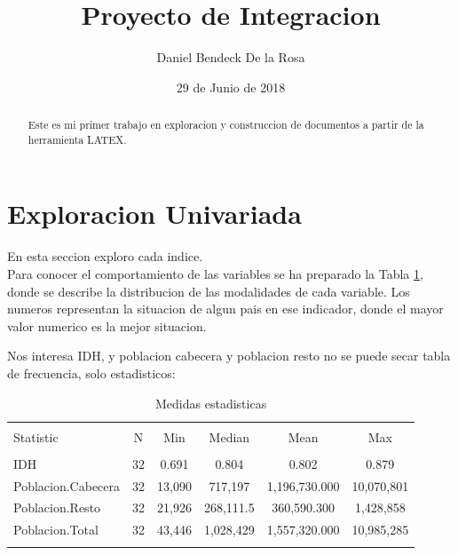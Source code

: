 \documentclass{article}
\title{Proyecto de Integracion}
\author{\normalsize Daniel Bendeck De la Rosa}
\affil{\small Escuela de Ingenieria,Universidad de los Andes\\Bogota, Colombia}
\date{29 de Junio de 2018}
\begin{document}


\maketitle


%


\begin{abstract}
Este es mi primer trabajo en exploracion y construccion de documentos a partir de la herramienta LATEX. 
\end{abstract}


\section{Exploracion Univariada}\label{univariada}

En esta seccion exploro cada indice.\\

Para conocer el comportamiento de las variables se ha preparado la Tabla \ref{stats}, donde se describe la distribucion de las modalidades de cada variable. Los numeros representan la situacion de algun pais en ese indicador, donde el mayor valor numerico es la mejor situacion.


Nos interesa IDH, y poblacion cabecera y poblacion resto no se puede secar tabla de frecuencia, solo estadisticos:

\begin{table}[!htbp] \centering 
  \caption{Medidas estadisticas} 
  \label{stats} 
\begin{tabular}{@{\extracolsep{5pt}}lccccc} 
\\[-1.8ex]\hline 
\hline \\[-1.8ex] 
Statistic & \multicolumn{1}{c}{N} & \multicolumn{1}{c}{Min} & \multicolumn{1}{c}{Median} & \multicolumn{1}{c}{Mean} & \multicolumn{1}{c}{Max} \\ 
\hline \\[-1.8ex] 
IDH & 32 & 0.691 & 0.804 & 0.802 & 0.879 \\ 
Poblacion.Cabecera & 32 & 13,090 & 717,197 & 1,196,730.000 & 10,070,801 \\ 
Poblacion.Resto & 32 & 21,926 & 268,111.5 & 360,590.300 & 1,428,858 \\ 
Poblacion.Total & 32 & 43,446 & 1,028,429 & 1,557,320.000 & 10,985,285 \\ 
\hline \\[-1.8ex] 
\end{tabular} 
\end{table} \label{stats}
\end{document}
